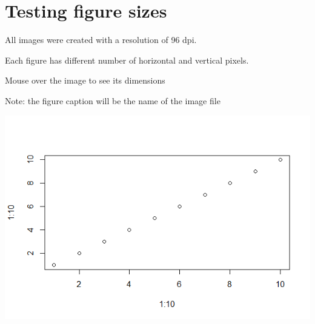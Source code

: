 \documentclass[
]{article}
\begin{document}
\section{Testing figure sizes}\label{testing-figure-sizes}

All images were created with a resolution of 96 dpi.

Each figure has different number of horizontal and vertical pixels.

Mouse over the image to see its dimensions

Note: the figure caption will be the name of the image file

\includegraphics[width=600px]{figures/test6}
\end{document}
